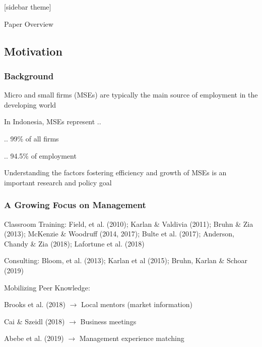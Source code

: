 \documentclass[hideothersubsections, usenames,dvipsnames,11pt]{beamer}
\newenvironment{itemize_3pt}{\itemize\addtolength{\itemsep}{3pt}}{\enditemize}
\begin{document}
[sidebar theme]

\begin{frame}{Paper Overview}
\end{frame}


\subsection{Motivation}

\begin{frame}
\frametitle{Background}
	\begin{itemize_3pt}
	\item Micro and small firms (MSEs) are typically the main \textcolor{bdf}{source of employment} in the developing world
	\item In \textcolor{bdf}{Indonesia}, MSEs represent .. 
	\begin{itemize_3pt}
		\item .. 99\% of all firms
		\item .. 94.5\% of employment
	\end{itemize_3pt} 
	\item Understanding the factors fostering efficiency and growth of MSEs is an important research and policy goal
	\end{itemize_3pt}
\end{frame}

\begin{frame}
\frametitle{A Growing Focus on Management}
\begin{itemize_3pt}
\item \textcolor{bdf}{Classroom Training}: Field, et al. (2010); Karlan \& Valdivia (2011); Bruhn \& Zia (2013); McKenzie \& Woodruff (2014, 2017); Bulte et al. (2017); Anderson, Chandy \& Zia (2018); Lafortune et al. (2018)
\vspace{0.1in}
\item \textcolor{bdf}{Consulting}: Bloom, et al. (2013); Karlan et al (2015); Bruhn, Karlan \& Schoar (2019)
\vspace{0.1in}

\item \textcolor{bdf}{Mobilizing Peer Knowledge}:
    \begin{itemize_3pt}
    \item Brooks et al. (2018) $\rightarrow$ Local mentors (market information)
    \item Cai \& Szeidl (2018) $\rightarrow$ Business meetings
    \item Abebe et al. (2019) $\rightarrow$ Management experience matching
    \end{itemize_3pt}
    \vspace{0.1in}
\end{itemize_3pt}
\end{frame}
\end{document}
